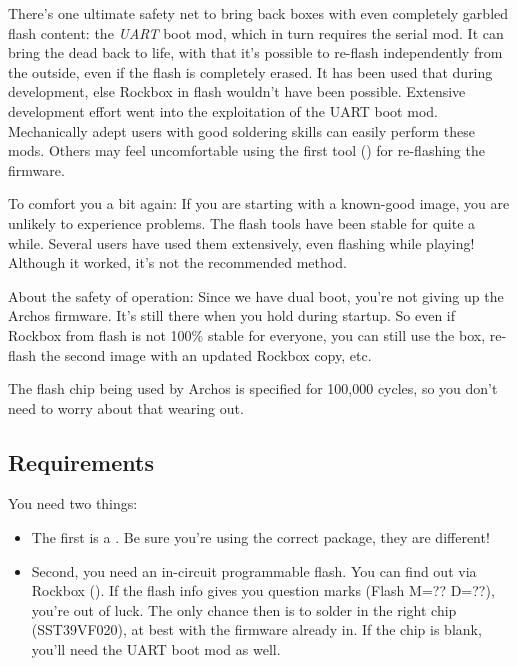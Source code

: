 
There's one ultimate safety net to bring back boxes with even completely 
garbled flash content: the \emph{UART} boot mod, which in turn requires the 
serial mod. It can bring the dead back to life, with that it's possible to 
re-flash independently from the outside, even if the flash is completely erased.
It has been used that during development, else Rockbox in flash wouldn't have 
been possible. Extensive development effort went into the exploitation of the 
UART boot mod. Mechanically adept users with good soldering skills can easily 
perform these mods. Others may feel uncomfortable using the first tool 
() for re-flashing the firmware.


To comfort you a bit again: If you are starting with a known-good image, you 
are unlikely to experience problems. The flash tools have been stable for quite
a while. Several users have used them extensively, even flashing while playing!
Although it worked, it's not the recommended method.

About the safety of operation: Since we have dual boot, you're not giving up 
the Archos firmware. It's still there when you hold
 during startup. So even if Rockbox from flash is not 100\% stable for
everyone, you can still use the box, re-flash the second image with an updated 
Rockbox copy, etc.

The flash chip being used by Archos is specified for 100,000 cycles, so you don't need to worry about that wearing out.

\subsection{Requirements}
You need two things:
\begin{itemize}
\item The first is a \playername. Be sure you're using the correct package, 
  they are different!
\item Second, you need an in-circuit programmable flash.  You can find out via Rockbox (). If the flash info gives you question marks (Flash M=?? D=??), 
  you're out of luck. The only chance then is to solder in the right chip 
  (SST39VF020), at best with the firmware already in. If the chip is blank, 
  you'll need the UART boot mod as well.
\end{itemize}

